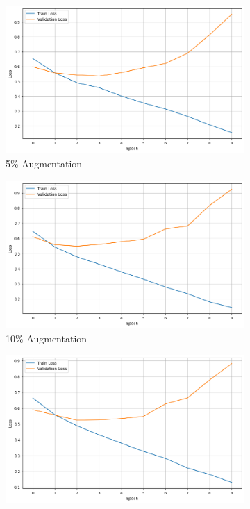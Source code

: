 \documentclass{article}
\begin{document}
\begin{figure}[h]
  \centering
  \begin{subfigure}[b]{0.3\textwidth}
    \includegraphics[width=\textwidth]{img/synonym_loss_5.png}
    \caption{5\% Augmentation}
    \label{fig:synonym_loss_5}
  \end{subfigure}
  \hfill
  \begin{subfigure}[b]{0.3\textwidth}
    \includegraphics[width=\textwidth]{img/synonym_loss_10.png}
    \caption{10\% Augmentation}
    \label{fig:synonym_loss_10}
  \end{subfigure}
  \hfill
  \begin{subfigure}[b]{0.3\textwidth}
    \includegraphics[width=\textwidth]{img/synonym_loss_20.png}

\end{subfigure}
\end{figure}
\end{document}
